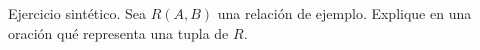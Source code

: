 Ejercicio sintético. Sea $R(A, B)$ una relación de ejemplo. Explique en una oración qué representa una tupla de $R$.
